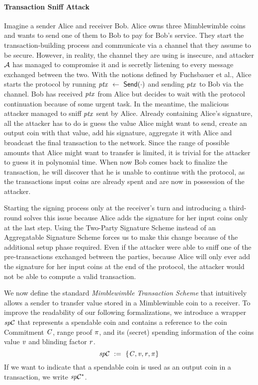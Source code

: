 \paragraph{Transaction Sniff Attack}
Imagine a sender Alice and receiver Bob.
Alice owns three Mimblewimble coins and wants to send one of them to Bob to pay for Bob's service.
They start the transaction-building process and communicate via a channel that they assume to be secure.
However, in reality, the channel they are using is insecure, and attacker $\mathcal{A}$ has managed to compromise it and is secretly listening to every message exchanged between the two.
With the notions defined by Fuchsbauer et al., Alice starts the protocol by running $\mathit{ptx} ~\leftarrow~ \mathsf{Send}(\cdot)$ and sending $\mathit{ptx}$ to Bob via the channel.
Bob has received $\mathit{ptx}$ from Alice but decides to wait with the protocol continuation because of some urgent task.
In the meantime, the malicious attacker managed to sniff $\mathit{ptx}$ sent by Alice.
Already containing Alice's signature, all the attacker has to do is guess the value Alice might want to send, create an output coin with that value, add his signature, aggregate it with Alice and broadcast the final transaction to the network.
Since the range of possible amounts that Alice might want to transfer is limited, it is trivial for the attacker to guess it in polynomial time.
When now Bob comes back to finalize the transaction, he will discover that he is unable to continue with the protocol, as the transactions input coins are already spent and are now in possession of the attacker.

Starting the signing process only at the receiver's turn and introducing a third-round solves this issue because Alice adds the signature for her input coins only at the last step.
Using the Two-Party Signature Scheme instead of an Aggregatable Signature Scheme forces us to make this change because of the additional setup phase required.
Even if the attacker were able to sniff one of the pre-transactions exchanged between the parties, because Alice will only ever add the signature for her input coins at the end of the protocol, the attacker would not be able to compute a valid transaction.

We now define the standard \emph{Mimblewimble Transaction Scheme} that intuitively allows a sender to transfer value stored in a Mimblewimble coin to a receiver.
To improve the readability of our following formalizations, we introduce a wrapper $\mathit{sp}\mathcal{C}$ that represents a spendable coin and contains a reference to the coin Commitment $\mathit{C}$, range proof $\pi$, and its (secret) spending information of the coins value $\mathit{v}$ and blinding factor $\mathit{r}$.
\[ \mathit{sp}\mathcal{C} ~:=~ \{ \mathit{C}, \mathit{v}, \mathit{r}, \pi \} \]
If we want to indicate that a spendable coin is used as an output coin in a transaction, we write $\mathit{sp}\mathcal{C}^*$.

